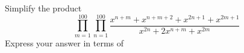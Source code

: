 Simplify the product
\[
\prod_{m=1}^{100}\prod_{n=1}^{100}\frac{x^{n+m}+x^{n+m+2}+x^{2n+1}+x^{2m+1}}{x^{2n}+2x^{n+m}+x^{2m}}
\]
Express your answer in terms of 